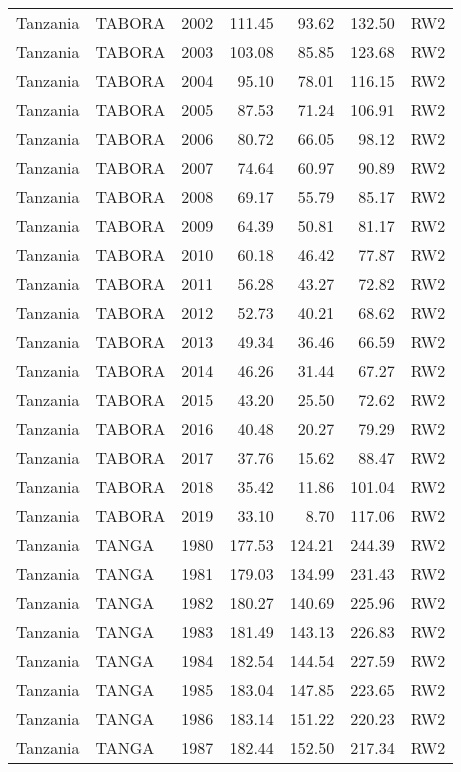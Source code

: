 \begin{longtable}{lllrrrl}
  Tanzania & TABORA & 2002 & 111.45 & 93.62 & 132.50 & RW2 \\ 
  Tanzania & TABORA & 2003 & 103.08 & 85.85 & 123.68 & RW2 \\ 
  Tanzania & TABORA & 2004 & 95.10 & 78.01 & 116.15 & RW2 \\ 
  Tanzania & TABORA & 2005 & 87.53 & 71.24 & 106.91 & RW2 \\ 
  Tanzania & TABORA & 2006 & 80.72 & 66.05 & 98.12 & RW2 \\ 
  Tanzania & TABORA & 2007 & 74.64 & 60.97 & 90.89 & RW2 \\ 
  Tanzania & TABORA & 2008 & 69.17 & 55.79 & 85.17 & RW2 \\ 
  Tanzania & TABORA & 2009 & 64.39 & 50.81 & 81.17 & RW2 \\ 
  Tanzania & TABORA & 2010 & 60.18 & 46.42 & 77.87 & RW2 \\ 
  Tanzania & TABORA & 2011 & 56.28 & 43.27 & 72.82 & RW2 \\ 
  Tanzania & TABORA & 2012 & 52.73 & 40.21 & 68.62 & RW2 \\ 
  Tanzania & TABORA & 2013 & 49.34 & 36.46 & 66.59 & RW2 \\ 
  Tanzania & TABORA & 2014 & 46.26 & 31.44 & 67.27 & RW2 \\ 
  Tanzania & TABORA & 2015 & 43.20 & 25.50 & 72.62 & RW2 \\ 
  Tanzania & TABORA & 2016 & 40.48 & 20.27 & 79.29 & RW2 \\ 
  Tanzania & TABORA & 2017 & 37.76 & 15.62 & 88.47 & RW2 \\ 
  Tanzania & TABORA & 2018 & 35.42 & 11.86 & 101.04 & RW2 \\ 
  Tanzania & TABORA & 2019 & 33.10 & 8.70 & 117.06 & RW2 \\ 
  Tanzania & TANGA & 1980 & 177.53 & 124.21 & 244.39 & RW2 \\ 
  Tanzania & TANGA & 1981 & 179.03 & 134.99 & 231.43 & RW2 \\ 
  Tanzania & TANGA & 1982 & 180.27 & 140.69 & 225.96 & RW2 \\ 
  Tanzania & TANGA & 1983 & 181.49 & 143.13 & 226.83 & RW2 \\ 
  Tanzania & TANGA & 1984 & 182.54 & 144.54 & 227.59 & RW2 \\ 
  Tanzania & TANGA & 1985 & 183.04 & 147.85 & 223.65 & RW2 \\ 
  Tanzania & TANGA & 1986 & 183.14 & 151.22 & 220.23 & RW2 \\ 
  Tanzania & TANGA & 1987 & 182.44 & 152.50 & 217.34 & RW2 \\ 

\end{longtable}
